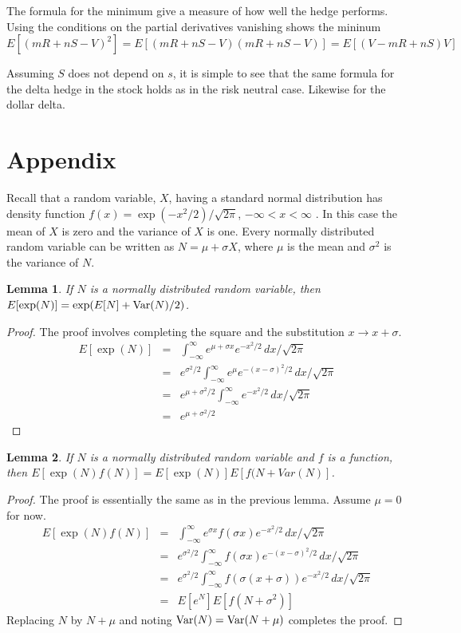 \documentclass[12pt,fleqn]{amsart}
\newcommand{\Var}{\mathop{\rm Var}}
\newtheorem*{lemma}{Lemma}
\begin{document}
The formula for the minimum give a measure of how well the
hedge performs. Using the conditions on the partial derivatives
vanishing shows the mininum $E[(mR + nS - V)^2]
= E[(mR + nS - V)(mR + nS - V)] = E[(V - mR + nS)V]$

Assuming $S$ does not depend on $s$, it is simple to see that
the same formula for the delta hedge in the stock holds as in the risk
neutral case. Likewise for the dollar delta.

\section{Appendix}

Recall that a random variable, $X$, having a standard normal distribution
has density function $f(x) = \exp(-x^2/2)/\sqrt{2\pi}$, $-\infty < x <
\infty$ \cite{normal}. In this case the mean of $X$ is zero and the
variance of $X$ is one.  Every normally distributed random variable can
be written as $N = \mu + \sigma X$, where $\mu$ is the mean and $\sigma^2$
is the variance of $N$.

\begin{lemma}
If $N$ is a normally distributed random variable,
then $E[\exp(N)] = \exp(E[N] + \Var(N)/2)$.
\end{lemma}

\begin{proof}
The proof involves completing the square and the substitution
$x\to x + \sigma$.
\begin{eqnarray*}
E[\exp(N)]
 &=& \int_{-\infty}^\infty e^{\mu + \sigma x}
 	e^{-x^2/2}\, dx/\sqrt{2\pi}\\
 &=& e^{\sigma^2/2}\int_{-\infty}^\infty e^\mu
 	e^{-(x - \sigma)^2/2}\, dx/\sqrt{2\pi}\\
 &=& e^{\mu + \sigma^2/2}\int_{-\infty}^\infty
 	e^{-x^2/2}\, dx/\sqrt{2\pi}\\
 &=& e^{\mu + \sigma^2/2}
\end{eqnarray*}
\end{proof}

\begin{lemma}
If $N$ is a normally distributed random variable and $f$ is a function,
then $E[\exp(N)f(N)] = E[\exp(N)]E[f(N + Var(N)]$.
\end{lemma}

\begin{proof}
The proof is essentially the same as in the previous lemma.
Assume $\mu = 0$ for now.
\begin{eqnarray*}
E[\exp(N)f(N)]
 &=& \int_{-\infty}^\infty e^{\sigma x} f(\sigma x)
    e^{-x^2/2}\, dx/\sqrt{2\pi}\\
 &=& e^{\sigma^2/2}\int_{-\infty}^\infty f(\sigma x)
    e^{-(x - \sigma)^2/2}\, dx/\sqrt{2\pi}\\
 &=& e^{\sigma^2/2}\int_{-\infty}^\infty
    f(\sigma(x + \sigma))e^{-x^2/2}\, dx/\sqrt{2\pi}\\
 &=& E[e^N] E[f(N + \sigma^2)]
\end{eqnarray*}
Replacing $N$ by $N + \mu$ and noting $\Var(N) = \Var(N + \mu)$
completes the proof.
\end{proof}
\end{document}
